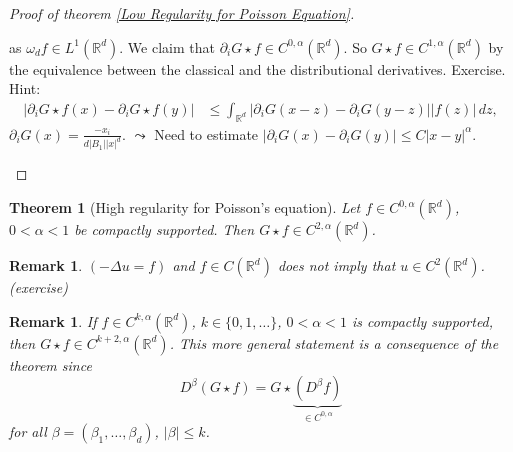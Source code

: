 \documentclass{report}
\theoremstyle{tommy}
\newtheorem{thm}[defn]{Theorem}
\newtheorem{rem}[defn]{Remark}
\begin{document}
\begin{proof}[Proof of theorem \ref{Low Regularity for Poisson Equation}]
\begin{enumerate}[label=\alph*)]
        as \(\omega_d f \in L^1(\mathbb{R}^d)\). We claim that \(\partial_i G \star f \in C^{0, \alpha}(\mathbb{R}^d)\). So \(G \star f \in C^{1, \alpha}(\mathbb{R}^d)\) by the equivalence between the classical and the distributional derivatives. Exercise. Hint:
        \begin{align*}
          |\partial_i G\star f(x) - \partial_i G \star f(y)|
          &\le \int_{\mathbb{R}^d} |\partial_i G(x-z) - \partial_i G(y-z)||f(z)| \, dz,
        \end{align*}
        \(\partial_i G(x) = \frac{-x_i}{d|B_1||x|^d}\). \(\leadsto\) Need to estimate \(|\partial_i G(x) - \partial_i G(y)| \le C|x-y|^\alpha\). \qedhere
    \end{enumerate}
  \end{proof}

  \begin{thm}[High regularity for Poisson's equation]\label{High regularity for Poisson's equation}
    Let \(f \in C^{0, \alpha}(\mathbb{R}^d)\), \(0 < \alpha < 1\) be compactly supported. Then \(G \star f \in C^{2, \alpha}(\mathbb{R}^d)\).
  \end{thm}

  \begin{rem}
    \((- \Delta u = f)\) and \(f \in C(\mathbb{R}^d)\) does not imply that \(u \in C^2(\mathbb{R}^d)\). (exercise)
  \end{rem}

  \begin{rem}
    If \(f \in C^{k, \alpha}(\mathbb{R}^d)\), \(k \in \{0, 1, \dots\}\), \(0 < \alpha < 1\) is compactly supported, then \(G \star f \in C^{k + 2, \alpha}(\mathbb{R}^d)\). This more general statement is a consequence of the theorem since
    \[D^\beta(G \star f) = G \star \underbrace{(D^\beta f)}_{\in C^{0, \alpha}}\]
    for all \(\beta = (\beta_1, \dots, \beta_d)\), \(|\beta| \le k\).
  \end{rem}
\end{document}
